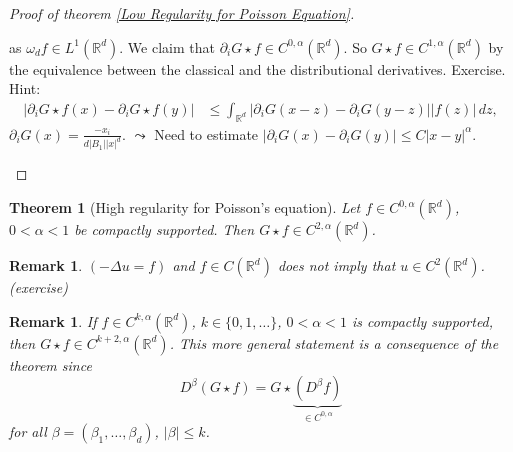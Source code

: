 \documentclass{report}
\theoremstyle{tommy}
\newtheorem{thm}[defn]{Theorem}
\newtheorem{rem}[defn]{Remark}
\begin{document}
\begin{proof}[Proof of theorem \ref{Low Regularity for Poisson Equation}]
\begin{enumerate}[label=\alph*)]
        as \(\omega_d f \in L^1(\mathbb{R}^d)\). We claim that \(\partial_i G \star f \in C^{0, \alpha}(\mathbb{R}^d)\). So \(G \star f \in C^{1, \alpha}(\mathbb{R}^d)\) by the equivalence between the classical and the distributional derivatives. Exercise. Hint:
        \begin{align*}
          |\partial_i G\star f(x) - \partial_i G \star f(y)|
          &\le \int_{\mathbb{R}^d} |\partial_i G(x-z) - \partial_i G(y-z)||f(z)| \, dz,
        \end{align*}
        \(\partial_i G(x) = \frac{-x_i}{d|B_1||x|^d}\). \(\leadsto\) Need to estimate \(|\partial_i G(x) - \partial_i G(y)| \le C|x-y|^\alpha\). \qedhere
    \end{enumerate}
  \end{proof}

  \begin{thm}[High regularity for Poisson's equation]\label{High regularity for Poisson's equation}
    Let \(f \in C^{0, \alpha}(\mathbb{R}^d)\), \(0 < \alpha < 1\) be compactly supported. Then \(G \star f \in C^{2, \alpha}(\mathbb{R}^d)\).
  \end{thm}

  \begin{rem}
    \((- \Delta u = f)\) and \(f \in C(\mathbb{R}^d)\) does not imply that \(u \in C^2(\mathbb{R}^d)\). (exercise)
  \end{rem}

  \begin{rem}
    If \(f \in C^{k, \alpha}(\mathbb{R}^d)\), \(k \in \{0, 1, \dots\}\), \(0 < \alpha < 1\) is compactly supported, then \(G \star f \in C^{k + 2, \alpha}(\mathbb{R}^d)\). This more general statement is a consequence of the theorem since
    \[D^\beta(G \star f) = G \star \underbrace{(D^\beta f)}_{\in C^{0, \alpha}}\]
    for all \(\beta = (\beta_1, \dots, \beta_d)\), \(|\beta| \le k\).
  \end{rem}
\end{document}
